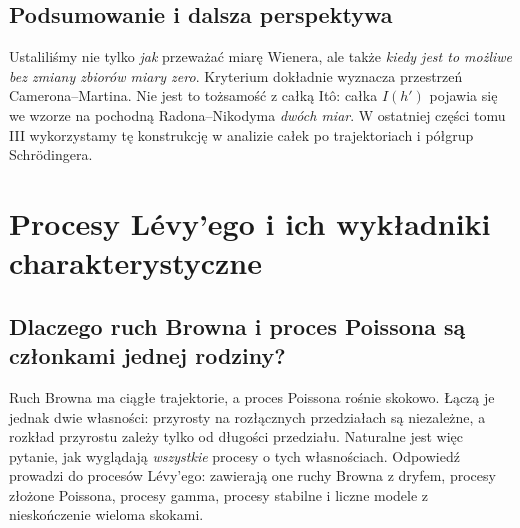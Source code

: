 \documentclass[11pt,a4paper,oneside]{report}
\numberwithin{equation}{chapter}
\theoremstyle{plain}
\theoremstyle{definition}
\theoremstyle{remark}
\begin{document}
\section{Podsumowanie i dalsza perspektywa}\label{sec:volIII:09:08}
Ustaliliśmy nie tylko \emph{jak} przeważać miarę Wienera,
ale także \emph{kiedy jest to możliwe bez zmiany zbiorów miary zero}.
Kryterium dokładnie wyznacza przestrzeń Camerona--Martina.
Nie jest to tożsamość z całką Itô: całka $I(h')$ pojawia się
we wzorze na pochodną Radona--Nikodyma \emph{dwóch miar}.
W ostatniej części tomu III wykorzystamy tę konstrukcję
w analizie całek po trajektoriach i półgrup Schrödingera.

\chapter{Procesy Lévy'ego i ich wykładniki charakterystyczne}
\label{chap:volIII:10}
\par\smallskip{}\par\smallskip

\label{ch:levy}

\section{Dlaczego ruch Browna i proces Poissona są członkami jednej rodziny?}\label{sec:volIII:10:01}

Ruch Browna ma ciągłe trajektorie, a proces Poissona rośnie
skokowo. Łączą je jednak dwie własności: przyrosty na rozłącznych
przedziałach są niezależne, a rozkład przyrostu zależy tylko od
długości przedziału. Naturalne jest więc pytanie, jak wyglądają
\emph{wszystkie} procesy o tych własnościach.
Odpowiedź prowadzi do procesów Lévy'ego: zawierają one
ruchy Browna z dryfem, procesy złożone Poissona, procesy gamma,
procesy stabilne i liczne modele z nieskończenie wieloma skokami.
\end{document}
